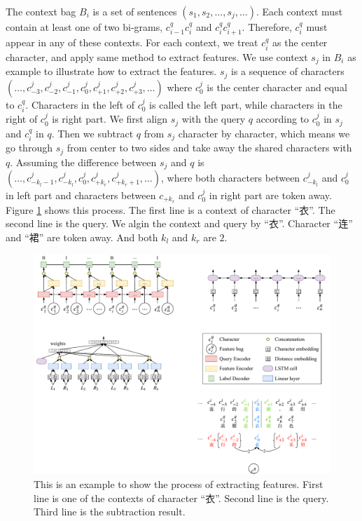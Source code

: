 The context bag $B_i$ is a set of sentences $(s_1, s_2, \ldots, s_j, \ldots)$. Each context must contain at least one of two bi-grams, $c_{i-1}^q c_i^q$ and $c_i^q c_{i+1}^q$. Therefore, $c_i^q$ must appear in any of these contexts. For each context, we treat $c_i^q$ as the center character, and apply same method to extract features. We use context $s_j$ in $B_i$ as example to illustrate how to extract the features. $s_j$ is a sequence of characters $(\ldots, c_{-3}^j, c_{-2}^j, c_{-1}^j, c_{0}^j, c_{+1}^j, c_{+2}^j, c_{+3}^j, \ldots)$ where $c_0^j$ is the center character and equal to $c_i^q$. Characters in the left of $c_0^j$ is called the left part, while characters in the right of $c_0^j$ is right part. We first align $s_j$ with the query $q$ according to $c_0^j$ in $s_j$ and $c_i^q$ in $q$. Then we subtract $q$ from $s_j$ character by character, which means we go through $s_j$ from center to two sides and take away the shared characters with $q$. Assuming the difference between $s_j$ and $q$ is $(\ldots, c_{-k_l-1}^j, c_{-k_l}^j, c_{0}^j, c_{+k_r}^j, c_{+k_r+1}^j, \ldots)$, where both characters between $c_{-k_l}^j$ and $c_{0}^j$ in left part and characters between $c_{+k_r}$ and $c_{0}^j$ in right part are token away. Figure \ref{fig:subtract} shows this process. The first line is a context of character ``衣''. The second line is the query. We algin the context and query by ``衣''. Character ``连'' and ``裙'' are token away. And both $k_l$ and $k_r$ are $2$.

\begin{figure}[th]
	\centering
	\includegraphics[width=0.9\columnwidth]{figures/lr.pdf}
	\caption{\small This is an example to show the process of extracting features. First line is one of the contexts of character ``衣''. Second line is the query. Third line is the subtraction result.}
	\label{fig:subtract}
	\vspace{-10pt}
\end{figure}

